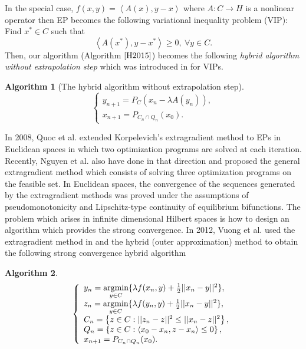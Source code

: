 \documentclass{aims}
\theoremstyle{definition}
\newtheorem{algorithm}{Algorithm}
\begin{document}
In the special case, $f(x,y)=\left\langle A(x),y-x\right\rangle$ where $A:C\to H$ is a nonlinear operator 
then EP becomes the following variational inequality problem (VIP): Find $x^*\in C$ such that
\begin{equation}\label{VIP}
\left\langle A(x^*),y-x^*\right\rangle\ge 0,~\forall y\in C.
\end{equation}
Then, our algorithm (Algorithm $\ref{H2015}$) becomes the following \textit{hybrid algorithm without extrapolation step} which was introduced 
in \cite{MS2015} for VIPs.
\begin{algorithm}[The hybrid algorithm without extrapolation step]\label{MS2015}
$$
\left \{
\begin{array}{ll}
y_{n+1}=  P_C\left(x_n-\lambda A(y_n)\right),\\
x_{n+1}=P_{C_n\cap Q_n}(x_0).
\end{array}
\right.
$$
\end{algorithm}
In 2008, Quoc et al. \cite{QMH2008} extended Korpelevich's extragradient method to EPs in Euclidean spaces in which 
two optimization programs are solved at each iteration. Recently, Nguyen et al. \cite{NSNN2015} also have done in that direction 
and proposed the general extragradient method which consists of solving three optimization programs on the feasible set. In Euclidean spaces, 
the convergence of the sequences generated by the extragradient methods \cite{NSNN2015,QMH2008} was proved under 
the assumptions of pseudomonotonicity and Lipschitz-type continuity of equilibrium bifunctions. The problem which arises in 
infinite dimensional Hilbert spaces is how to design an algorithm which provides the strong convergence.
In 2012, Vuong et al. \cite{VSN2012} used the extragradient method in \cite{QMH2008} and the hybrid (outer approximation) method 
to obtain the following strong convergence hybrid algorithm 
\begin{algorithm}\label{VSH2013a}
$$
\left \{
\begin{array}{ll}
y_n=  \underset{y\in C}{\rm argmin} \{ \lambda f(x_n, y) +\frac{1}{2}||x_n-y||^2\},\\ 
z_n = \underset{y\in C}{\rm argmin}\{ \lambda f(y_n, y) +\frac{1}{2}||x_n-y||^2\},\\
C_{n}=\left\{z\in C:||z_n-z||^2\le||x_n-z||^2\right\},\\
Q_n=\left\{z\in C:\left\langle x_0-x_n,z-x_n\right\rangle\le 0\right\},\\
x_{n+1}=P_{C_n\cap Q_n}(x_0).
\end{array}
\right.
$$
\end{algorithm}
\end{document}
